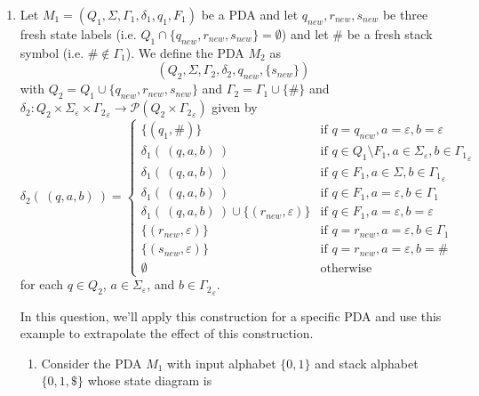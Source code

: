 \begin{enumerate}[wide, labelwidth=!, labelindent=0pt]
\begin{enumerate}
\item Let $M_1 = (Q_1, \Sigma, \Gamma_1, \delta_1, q_1, F_1)$ 
be a PDA and let $q_{new}, r_{new}, s_{new}$ be three fresh state labels 
(i.e. $Q_1 \cap \{q_{new}, r_{new}, s_{new}\} = \emptyset$) 
and let $\#$ be a fresh stack symbol (i.e. $\# \notin \Gamma_1$).
We define the PDA $M_2$ as
\[
   (Q_2, \Sigma, \Gamma_2, \delta_2, q_{new}, \{s_{new}\})
\]
with $Q_2 = Q_1 \cup \{q_{new}, r_{new}, s_{new}\}$ 
and $\Gamma_2 = \Gamma_1 \cup \{\#\}$
and 
$\delta_2 : Q_2 \times \Sigma_\varepsilon \times {\Gamma_2}_\varepsilon \to 
\mathcal{P}(Q_2 \times {\Gamma_2}_\varepsilon)$ given by 
\[
\delta_2 ( ~(q,a,b)~) = 
\begin{cases}
\{(q_1, \#)\} &\text{if } q = q_{new}, a = \varepsilon, b = \varepsilon\\
\delta_1( ~(q,a,b)~) &\text{if } q\in Q_1 \setminus F_1, a \in \Sigma_{\varepsilon}, b \in {\Gamma_1}_\varepsilon \\
\delta_1( ~(q,a,b)~) &\text{if } q\in F_1, a \in \Sigma, b \in {\Gamma_1}_\varepsilon \\
\delta_1( ~(q,a,b)~) &\text{if } q\in F_1, a =\varepsilon, b \in {\Gamma_1} \\
\delta_1( ~(q,a,b)~) \cup \{(r_{new}, \varepsilon)\} &\text{if } q\in F_1, a =\varepsilon, b =\varepsilon \\
\{(r_{new}, \varepsilon)\} &\text{if } q = r_{new}, a =\varepsilon, b \in \Gamma_{1} \\
\{(s_{new}, \varepsilon)\} &\text{if } q= r_{new}, a = \varepsilon, b = \#\\
\emptyset & \text{otherwise}
\end{cases}
\]
for each $q \in Q_2$, $a \in \Sigma_{\varepsilon}$, 
and $b \in {\Gamma_2}_\varepsilon$.

In this question, we'll apply this construction for a specific PDA and 
use this example to extrapolate the effect of this construction.
\begin{enumerate}

\item\gradeCorrect Consider the PDA $M_1$ with input alphabet $\{0,1\}$ 
and stack alphabet $\{0,1, \$\}$ whose state diagram is

\begin{center}

\end{center}
\end{enumerate}
\end{enumerate}
\end{enumerate}
